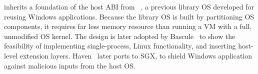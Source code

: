 \graphene{} inherits 
a foundation of the host ABI from \drawbridge{}~\cite{porter11drawbridge},
a previous library OS developed for reusing 
Windows applications.
Because the library OS is built by partitioning OS components,
it requires far less memory resource than running a VM with a full, unmodified OS kernel.
The \drawbridge{} design is later adopted by Bascule~\cite{baumann13bascule}
to show the feasibility of implementing single-process, Linux functionality, and inserting host-level extension layers.
Haven~\cite{baumann14haven} later ports \drawbridge{} to SGX,
to shield Windows application against malicious inputs from the host OS.



 





